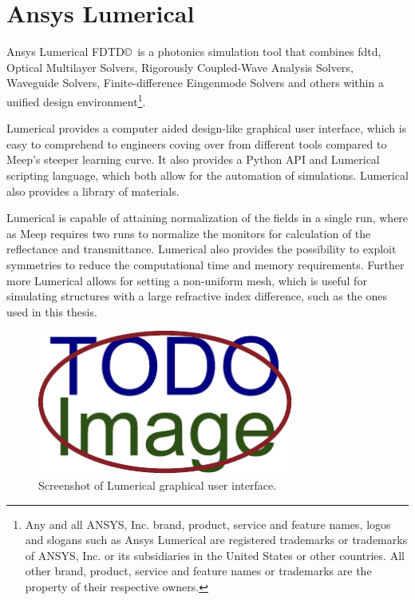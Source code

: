 \section{Ansys Lumerical}\label{sec:lumerical}
Ansys Lumerical FDTD\copyright \ is a photonics simulation tool that combines \gls{fdtd}, Optical Multilayer Solvers, Rigorously Coupled-Wave Analysis Solvers, Waveguide Solvers, Finite-difference Eingenmode Solvers and others within a unified design environment\footnote{Any and all ANSYS, Inc. brand, product, service and feature names, logos and slogans such as Ansys Lumerical are registered trademarks or trademarks of ANSYS, Inc. or its subsidiaries in the United States or other countries. All other brand, product, service and feature names or trademarks are the property of their respective owners.}.

Lumerical provides a computer aided design-like graphical user interface, which is easy to comprehend to engineers coving over from different tools compared to Meep's steeper learning curve. It also provides a Python API and Lumerical scripting language, which both allow for the automation of simulations. Lumerical also provides a library of materials. 

Lumerical is capable of attaining normalization of the fields in a single run, where as Meep requires two runs to normalize the monitors for calculation of the reflectance and transmittance. Lumerical also provides the possibility to exploit symmetries to reduce the computational time and memory requirements. Further more Lumerical allows for setting a non-uniform mesh, which is useful for simulating structures with a large refractive index difference, such as the ones used in this thesis. 


\begin{figure}[H]\label{fig:thin-film}
  \centering
  \includegraphics[width=0.75\textwidth]{obrazky-figures/placeholder.pdf}
  \caption{Screenshot of Lumerical graphical user interface.}
\end{figure}



